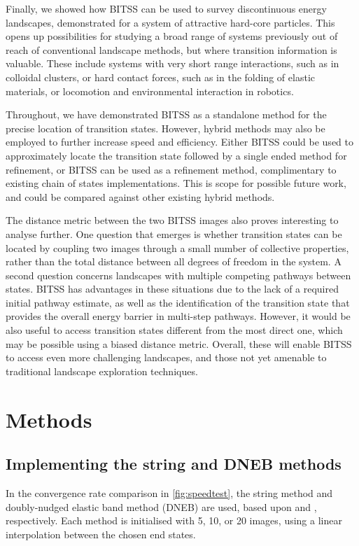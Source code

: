 \documentclass[twocolumn,10pt]{revtex4}
\begin{document}
Finally, we showed how BITSS can be used to survey discontinuous energy landscapes, demonstrated for a system of attractive hard-core particles.
This opens up possibilities for studying a broad range of systems previously out of reach of conventional landscape methods, but where transition information is valuable.
These include systems with very short range interactions, such as in colloidal clusters, or hard contact forces, such as in the folding of elastic materials, or locomotion and environmental interaction in robotics.

Throughout, we have demonstrated BITSS as a standalone method for the precise location of transition states.
However, hybrid methods may also be employed to further increase speed and efficiency.
Either BITSS could be used to approximately locate the transition state followed by a single ended method for refinement, or BITSS can be used as a refinement method, complimentary to existing chain of states implementations.
This is scope for possible future work, and could be compared against other existing hybrid methods.

The distance metric between the two BITSS images also proves interesting to analyse further.
One question that emerges is whether transition states can be located by coupling two images through a small number of collective properties, rather than the total distance between all degrees of freedom in the system.
A second question concerns landscapes with multiple competing pathways between states.
BITSS has advantages in these situations due to the lack of a required initial pathway estimate, as well as the identification of the transition state that provides the overall energy barrier in multi-step pathways.
However, it would be also useful to access transition states different from the most direct one, which may be possible using a biased distance metric.
Overall, these will enable BITSS to access even more challenging landscapes, and those not yet amenable to traditional landscape exploration techniques.


\section{Methods}

\subsection{Implementing the string and DNEB methods}
In the convergence rate comparison in \cref{fig:speedtest}, the string method and doubly-nudged elastic band method (DNEB) are used, based upon \cite{E2007} and \cite{Trygubenko2004}, respectively.
Each method is initialised with 5, 10, or 20 images, using a linear interpolation between the chosen end states.
\end{document}
